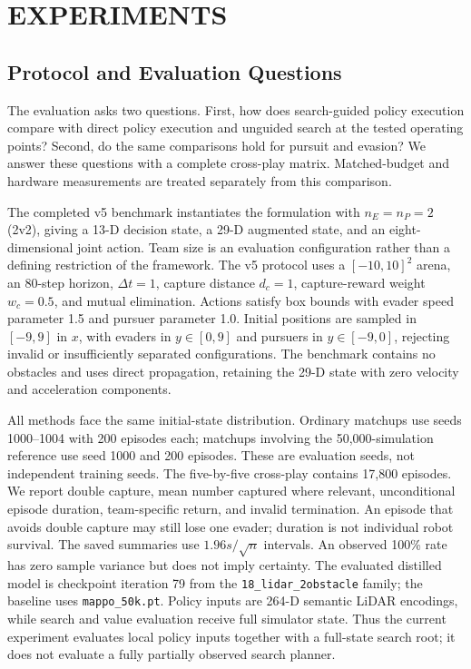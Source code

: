 \documentclass[letterpaper,10pt,conference]{ieeeconf}
\begin{document}
\section{EXPERIMENTS}

\subsection{Protocol and Evaluation Questions}

The evaluation asks two questions. First, how does search-guided policy
execution compare with direct policy execution and unguided search at the
tested operating points? Second, do the same comparisons hold for pursuit
and evasion? We answer these questions with a complete cross-play matrix.
Matched-budget and hardware measurements are treated separately from this
comparison.

The completed v5 benchmark instantiates the formulation with
$n_E=n_P=2$ (2v2), giving a 13-D decision state, a 29-D augmented state,
and an eight-dimensional joint action. Team size is an evaluation
configuration rather than a defining restriction of the framework.
The v5 protocol uses a $[-10,10]^2$ arena, an 80-step horizon,
$\Delta t=1$, capture distance $d_c=1$, capture-reward weight $w_c=0.5$,
and mutual elimination.
Actions satisfy box bounds with evader speed parameter 1.5 and pursuer
parameter 1.0. Initial positions are sampled in $[-9,9]$ in $x$, with
evaders in $y\in[0,9]$ and pursuers in $y\in[-9,0]$, rejecting invalid
or insufficiently separated configurations. The benchmark contains no
obstacles and uses direct propagation, retaining the 29-D state with
zero velocity and acceleration components.

All methods face the same initial-state distribution. Ordinary matchups
use seeds 1000--1004 with 200 episodes each; matchups involving the
50,000-simulation reference use seed 1000 and 200 episodes. These are
evaluation seeds, not independent training seeds. The five-by-five
cross-play contains 17,800 episodes. We report double capture, mean
number captured where relevant, unconditional episode duration,
team-specific return, and invalid termination. An episode that avoids
double capture may still lose one evader; duration is not individual
robot survival. The saved summaries use $1.96s/\sqrt n$ intervals. An
observed 100\% rate has zero sample variance but does not imply certainty.
The evaluated distilled model is checkpoint iteration 79 from the
\texttt{18\_lidar\_2obstacle} family; the baseline uses
\texttt{mappo\_50k.pt}. Policy inputs are 264-D semantic LiDAR encodings,
while search and value evaluation receive full simulator state. Thus the
current experiment evaluates local policy inputs together with a
full-state search root; it does not evaluate a fully partially observed
search planner.
\end{document}
